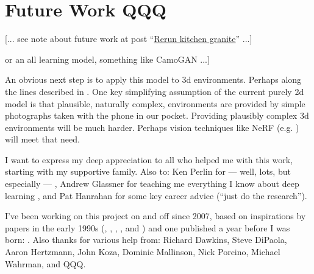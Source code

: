 \documentclass[acmtog]{acmart}
\begin{document}
\section{Future Work QQQ}
[... see note about future work at post “\href{https://cwreynolds.github.io/TexSyn/#20221106}{Rerun kitchen granite}” ...]
\par
[... propose a crowd sourced user study of camouflage quality ... could be based on time to find ... like the interactive web games of \href{https://www.visual-ecology.com/2020/10/06/martin-stevens/}{Martin Stevens} nuthatch egg? ...] 
\par
[... currently a “mixed paradigm” model using both evolution and learning ... (maybe note these typically co-occur in nature  \cite{valiant_probably_2013}) ... propose an all-evolution model with evolved detectors for predators [... perhaps like the work of \href{https://people.wgtn.ac.nz/Mengjie.Zhang}{Mengjie Zhang} or his students like \href{https://yingbi92.github.io/homepage/}{Ying Bi}? find a representative paper to cite, perhaps coauthored by them ...] or an all learning model, something like CamoGAN \cite{talas_camogan_2020} ...]
\par
An obvious next step is to apply this model to 3d environments. Perhaps along the lines described in \citet{miller_color_2022}. One key simplifying assumption of the current purely 2d model is that plausible, naturally complex, environments are provided by simple photographs taken with the phone in our pocket. Providing plausibly complex 3d environments will be much harder. Perhaps vision techniques like NeRF (e.g. \cite{gao_nerf_2022}) will meet that need.
\par


\begin{acks}
I want to express my deep appreciation to all who helped me with this work, starting with my supportive family. Also to: Ken Perlin for — well, lots, but especially — \citet{perlin_image_1985}, Andrew Glassner for teaching me everything I know about deep learning \cite{glassner_deep_2021}, and Pat Hanrahan for some key career advice (“just do the research”).
\par
I've been working on this project on and off since 2007, based on inspirations by papers in the early 1990s (\citet{witkin_reaction_1991}, \citet{turk_generating_1991}, \citet{angeline_competitive_1993}, \citet{sims_artificial_1991}, and \citet{sims_evolving_1994}) and one published a year before I was born: \citet{turing_chemical_1952}.
Also thanks for various help from:
Richard Dawkins,
Steve DiPaola,
Aaron Hertzmann,
John Koza,
Dominic Mallinson,
Nick Porcino,
Michael Wahrman, 
and
QQQ.


\end{acks}
\end{document}
